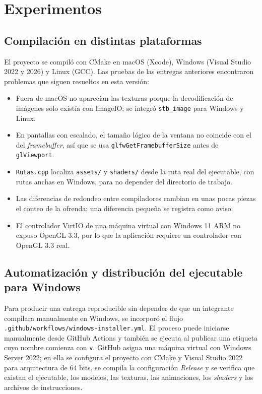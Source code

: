 \documentclass[letter,12pt]{article}
\begin{document}
	\section{Experimentos}

	\subsection{Compilación en distintas plataformas}
	El proyecto se compiló con CMake en macOS (Xcode), Windows (Visual Studio 2022 y 2026) y Linux (GCC). Las pruebas de las entregas anteriores encontraron problemas que siguen resueltos en esta versión:
	\begin{itemize}[leftmargin=*]
		\item Fuera de macOS no aparecían las texturas porque la decodificación de imágenes solo existía con ImageIO; se integró \texttt{stb\_image} para Windows y Linux.
		\item En pantallas con escalado, el tamaño lógico de la ventana no coincide con el del \textit{framebuffer}, así que se usa \texttt{glfwGetFramebufferSize} antes de \texttt{glViewport}.
		\item \texttt{Rutas.cpp} localiza \texttt{assets/} y \texttt{shaders/} desde la ruta real del ejecutable, con rutas anchas en Windows, para no depender del directorio de trabajo.
		\item Las diferencias de redondeo entre compiladores cambian en unas pocas piezas el conteo de la ofrenda; una diferencia pequeña se registra como aviso.
		\item El controlador VirtIO de una máquina virtual con Windows 11 ARM no expuso OpenGL 3.3, por lo que la aplicación requiere un controlador con OpenGL 3.3 real.
	\end{itemize}

	\subsection{Automatización y distribución del ejecutable para Windows}
	Para producir una entrega reproducible sin depender de que un integrante compilara manualmente en Windows, se incorporó el flujo \texttt{.github/workflows/windows-installer.yml}. El proceso puede iniciarse manualmente desde GitHub Actions y también se ejecuta al publicar una etiqueta cuyo nombre comienza con \texttt{v}. GitHub asigna una máquina virtual con Windows Server 2022; en ella se configura el proyecto con CMake y Visual Studio 2022 para arquitectura de 64 bits, se compila la configuración \textit{Release} y se verifica que existan el ejecutable, los modelos, las texturas, las animaciones, los \textit{shaders} y los archivos de instrucciones.
\end{document}
